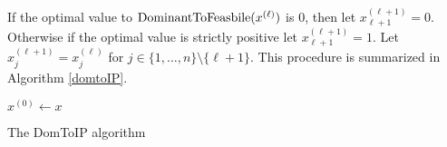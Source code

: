 If the optimal value to $\operatorname{DominantToFeasbile}(x^{(\ell)})$ is 0, then let $x^{(\ell+1)}_{\ell+1} = 0$. Otherwise if the optimal value is strictly positive let $x^{(\ell+1)}_{\ell+1} = 1$. Let $x^{(\ell+1)}_j = x^{(\ell)}_j$ for $j\in \{1,\ldots,n\}\setminus \{\ell+1\}$. This procedure is summarized in Algorithm \ref{domtoIP}.

\begin{algorithm}[H]\label{domtoIP}
	$x^{(0)}\leftarrow x$\\
	\caption{The DomToIP algorithm}
\end{algorithm}



